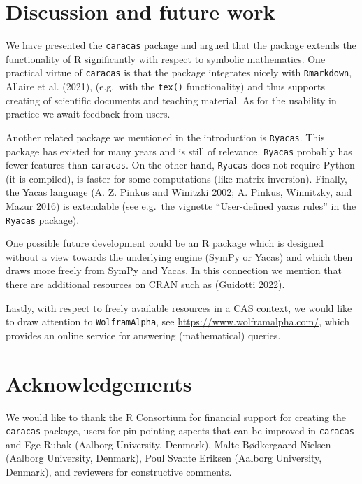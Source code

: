 \hypertarget{discussion-and-future-work}{%
\section{Discussion and future work}\label{discussion-and-future-work}}

We have presented the \texttt{caracas} package and argued that the
package extends the functionality of R significantly with respect to
symbolic mathematics. One practical virtue of \texttt{caracas} is
that the package integrates nicely with \texttt{Rmarkdown},
Allaire et al. (2021), (e.g.~with the \texttt{tex()} functionality) and thus
supports creating of scientific documents and teaching material. As
for the usability in practice we await feedback from users.

Another related package we mentioned in the introduction is \texttt{Ryacas}.
This package has existed for many years and is still of relevance.
\texttt{Ryacas} probably has fewer features than \texttt{caracas}. On the other
hand, \texttt{Ryacas} does not require Python (it is compiled), is faster for
some computations (like matrix inversion). Finally, the Yacas language
(A. Z. Pinkus and Winitzki 2002; A. Pinkus, Winnitzky, and Mazur 2016) is extendable (see e.g.~the vignette
``User-defined yacas rules'' in the \texttt{Ryacas} package).

One possible future development could be an R package which is
designed without a view towards the underlying engine (SymPy or Yacas)
and which then draws more freely from SymPy and Yacas.
In this connection we mention that there are additional resources
on CRAN such as  (Guidotti 2022).

Lastly, with respect to freely available resources in a CAS context, we would
like to draw attention to \texttt{WolframAlpha}, see
\url{https://www.wolframalpha.com/}, which provides an online service for
answering (mathematical) queries.

\hypertarget{acknowledgements}{%
\section{Acknowledgements}\label{acknowledgements}}

We would like to thank the R Consortium for financial support for
creating the \texttt{caracas} package, users for pin pointing aspects
that can be improved in \texttt{caracas} and Ege Rubak (Aalborg
University, Denmark), Malte Bødkergaard Nielsen (Aalborg
University, Denmark), Poul Svante Eriksen (Aalborg
University, Denmark), and reviewers
for constructive comments.


